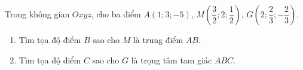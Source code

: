 \begin{bt}%
	Trong không gian $Oxyz$, cho ba điểm $A(1;3;-5)$, $M\left(\dfrac{3}{2};2;\dfrac{1}{2}\right)$, $G\left(2;\dfrac{2}{3};-\dfrac{2}{3}\right)$.
	\begin{enumerate}
		\item Tìm tọa độ điểm $B$ sao cho $M$ là trung điểm $AB$.
		\item Tìm tọa độ điểm $C$ sao cho $G$ là trọng tâm tam giác $ABC$.
	\end{enumerate}
\end{bt}


